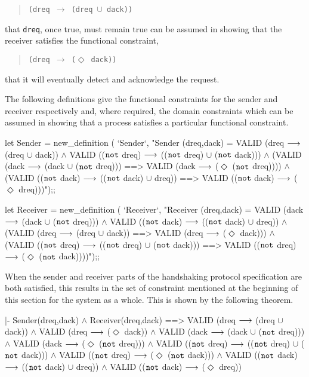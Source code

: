 \begin{quote}
\verb"(dreq "$\longrightarrow$\verb" (dreq "$\cup$\verb" dack))"
\end{quote}

\noindent
that \verb"dreq", once true,
must remain true can be assumed in showing that the receiver
satisfies the functional constraint,

\begin{quote}
\verb"(dreq "$\longrightarrow$\verb" ("$\Diamond$\verb" dack))"
\end{quote}

\noindent
that it will eventually detect and acknowledge the request.

The following definitions
give the functional constraints for
the sender and receiver respectively and, where required,
the domain constraints which can be assumed in showing that
a process satisfies a particular functional constraint.

\begintt
let Sender = new_definition (
  `Sender`,
  "Sender (dreq,dack) =
    VALID (dreq \(\longrightarrow\) (dreq \(\cup\) dack)) \(\wedge\)
    VALID ((\(\tt{not}\) dreq) \(\longrightarrow\) ((\(\tt{not}\) dreq) \(\cup\) (\(\tt{not}\) dack))) \(\wedge\)
    (VALID (dack \(\longrightarrow\) (dack \(\cup\) (\(\tt{not}\) dreq))) ==>
     VALID (dack \(\longrightarrow\) (\(\Diamond\) (\(\tt{not}\) dreq)))) \(\wedge\)
    (VALID ((\(\tt{not}\) dack) \(\longrightarrow\) ((\(\tt{not}\) dack) \(\cup\) dreq)) ==>
     VALID ((\(\tt{not}\) dack) \(\longrightarrow\) (\(\Diamond\) dreq)))");;

let Receiver = new_definition (
  `Receiver`,
  "Receiver (dreq,dack) =
    VALID (dack \(\longrightarrow\) (dack \(\cup\) (\(\tt{not}\) dreq))) \(\wedge\)
    VALID ((\(\tt{not}\) dack)  \(\longrightarrow\) ((\(\tt{not}\) dack) \(\cup\) dreq)) \(\wedge\)
    (VALID (dreq \(\longrightarrow\) (dreq \(\cup\) dack)) ==>
     VALID (dreq \(\longrightarrow\) (\(\Diamond\) dack))) \(\wedge\)
    (VALID ((\(\tt{not}\) dreq) \(\longrightarrow\) ((\(\tt{not}\) dreq) \(\cup\) (\(\tt{not}\) dack))) ==>
     VALID ((\(\tt{not}\) dreq) \(\longrightarrow\) (\(\Diamond\) (\(\tt{not}\) dack))))");;
\endtt

When the sender and receiver parts of the handshaking protocol
specification are both satisfied, this results in the set of
constraint mentioned at the beginning of this section
for the system as a whole.
This is shown by the following theorem.

\begintt
|- Sender(dreq,dack) \(\wedge\)
   Receiver(dreq,dack)
   ==>
   VALID (dreq \(\longrightarrow\) (dreq \(\cup\) dack)) \(\wedge\)
   VALID (dreq \(\longrightarrow\) (\(\Diamond\) dack)) \(\wedge\)
   VALID (dack \(\longrightarrow\) (dack \(\cup\) (\(\tt{not}\) dreq))) \(\wedge\)
   VALID (dack \(\longrightarrow\) (\(\Diamond\) (\(\tt{not}\) dreq))) \(\wedge\)
   VALID ((\(\tt{not}\) dreq) \(\longrightarrow\) ((\(\tt{not}\) dreq) \(\cup\) (\(\tt{not}\) dack))) \(\wedge\)
   VALID ((\(\tt{not}\) dreq) \(\longrightarrow\) (\(\Diamond\) (\(\tt{not}\) dack))) \(\wedge\)
   VALID ((\(\tt{not}\) dack) \(\longrightarrow\) ((\(\tt{not}\) dack) \(\cup\) dreq)) \(\wedge\)
   VALID ((\(\tt{not}\) dack) \(\longrightarrow\) (\(\Diamond\) dreq))
\endtt

